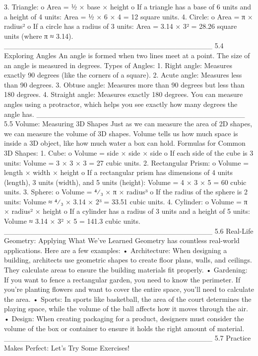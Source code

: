 3.	Triangle:
o	Area = ½ × base × height
o	If a triangle has a base of 6 units and a height of 4 units: Area = ½ × 6 × 4 = 12 square units.
4.	Circle:
o	Area = π × radius²
o	If a circle has a radius of 3 units: Area = 3.14 × 3² = 28.26 square units (where π ≈ 3.14).
________________________________________
5.4 Exploring Angles
An angle is formed when two lines meet at a point. The size of an angle is measured in degrees.
Types of Angles:
1.	Right angle: Measures exactly 90 degrees (like the corners of a square).
2.	Acute angle: Measures less than 90 degrees.
3.	Obtuse angle: Measures more than 90 degrees but less than 180 degrees.
4.	Straight angle: Measures exactly 180 degrees.
You can measure angles using a protractor, which helps you see exactly how many degrees the angle has.
________________________________________
5.5 Volume: Measuring 3D Shapes
Just as we can measure the area of 2D shapes, we can measure the volume of 3D shapes. Volume tells us how much space is inside a 3D object, like how much water a box can hold.
Formulas for Common 3D Shapes:
1.	Cube:
o	Volume = side × side × side
o	If each side of the cube is 3 units: Volume = 3 × 3 × 3 = 27 cubic units.
2.	Rectangular Prism:
o	Volume = length × width × height
o	If a rectangular prism has dimensions of 4 units (length), 3 units (width), and 5 units (height): Volume = 4 × 3 × 5 = 60 cubic units.
3.	Sphere:
o	Volume = ⁴⁄₃ × π × radius³
o	If the radius of the sphere is 2 units: Volume ≈ ⁴⁄₃ × 3.14 × 2³ = 33.51 cubic units.
4.	Cylinder:
o	Volume = π × radius² × height
o	If a cylinder has a radius of 3 units and a height of 5 units: Volume ≈ 3.14 × 3² × 5 = 141.3 cubic units.
________________________________________
5.6 Real-Life Geometry: Applying What We’ve Learned
Geometry has countless real-world applications. Here are a few examples:
•	Architecture: When designing a building, architects use geometric shapes to create floor plans, walls, and ceilings. They calculate areas to ensure the building materials fit properly.
•	Gardening: If you want to fence a rectangular garden, you need to know the perimeter. If you’re planting flowers and want to cover the entire space, you’ll need to calculate the area.
•	Sports: In sports like basketball, the area of the court determines the playing space, while the volume of the ball affects how it moves through the air.
•	Design: When creating packaging for a product, designers must consider the volume of the box or container to ensure it holds the right amount of material.
________________________________________
5.7 Practice Makes Perfect: Let’s Try Some Exercises!
